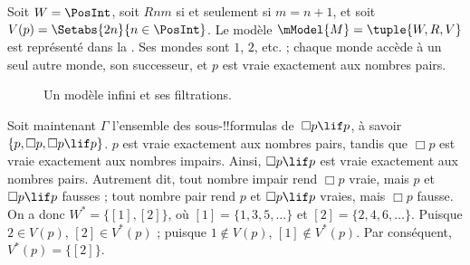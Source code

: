 \documentclass[../../../include/open-logic-section]{subfiles}
\begin{document}
\begin{ex}
  Soit $W = \PosInt$, soit $Rnm$ si et seulement si $m = n + 1$, et
  soit $V(p) = \Setabs{2n}{n \in
    \PosInt}$. Le modèle $\mModel{M} = \tuple{W, R, V}$ est représenté
  dans la . Ses mondes sont $1$, $2$, etc. ;
  chaque monde accède à un seul autre monde, son successeur, et $p$
  est vraie exactement aux nombres pairs.

  \begin{figure}
    \centering

    \caption{Un modèle infini et ses filtrations.}
  \end{figure}

  Soit maintenant $\Gamma$ l'ensemble des sous-!!{formula}s de~$\Box p \lif p$,
  à savoir $\{p, \Box p, \Box p \lif p\}$. $p$ est vraie exactement
  aux nombres pairs, tandis que $\Box p$ est vraie exactement aux
  nombres impairs. Ainsi, $\Box p \lif p$ est vraie exactement aux
  nombres pairs. Autrement dit, tout nombre impair rend $\Box p$
  vraie, mais $p$ et $\Box p \lif p$ fausses ; tout nombre pair rend
  $p$ et $\Box p \lif p$ vraies, mais $\Box p$ fausse. On a donc
  $W^* = \{ [1], [2] \}$, où $[1] = \{1, 3, 5, \dots\}$ et
  $[2] = \{2, 4, 6, \dots\}$. Puisque $2 \in V(p)$,
  $[2] \in V^*(p)$ ; puisque $1 \notin V(p)$,
  $[1] \notin V^*(p)$. Par conséquent, $V^*(p) = \{[2]\}$.


\end{ex}
\end{document}
